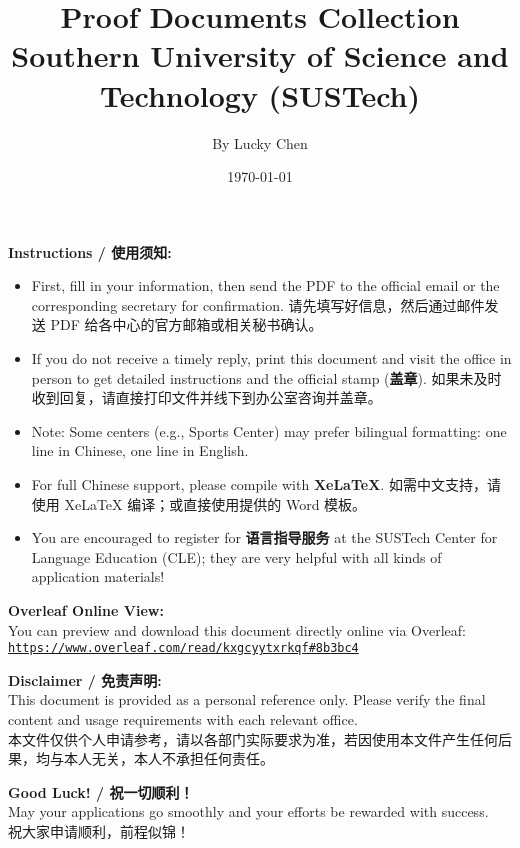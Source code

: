 \documentclass[12pt,a4paper]{article}
\title{
    \vspace{-2cm} %
    {\Huge \textbf{Proof Documents Collection}}\\[0.3cm]
    {\Large Southern University of Science and Technology (SUSTech)}
    \vspace{-0.5cm} %
}
\author{By Lucky Chen}
\date{\today}
\begin{document}
\maketitle
\thispagestyle{empty}

\noindent \textbf{Instructions / 使用须知:}

\begin{itemize}
    \item First, fill in your information, then send the PDF to the official email or the corresponding secretary for confirmation. 请先填写好信息，然后通过邮件发送 PDF 给各中心的官方邮箱或相关秘书确认。
    \item If you do not receive a timely reply, print this document and visit the office in person to get detailed instructions and the official stamp (\textbf{盖章}). 如果未及时收到回复，请直接打印文件并线下到办公室咨询并盖章。
    \item Note: Some centers (e.g., Sports Center) may prefer bilingual formatting: one line in Chinese, one line in English.
    \item For full Chinese support, please compile with \textbf{XeLaTeX}. 如需中文支持，请使用 XeLaTeX 编译；或直接使用提供的 Word 模板。
    \item You are encouraged to register for \textbf{语言指导服务} at the SUSTech Center for Language Education (CLE); they are very helpful with all kinds of application materials!
\end{itemize}

\noindent \textbf{Overleaf Online View:} \\
You can preview and download this document directly online via Overleaf: \\
\href{https://www.overleaf.com/read/kxgcyytxrkqf#8b3bc4}{\texttt{https://www.overleaf.com/read/kxgcyytxrkqf\#8b3bc4}}

\vspace{0.5cm}
\noindent \textbf{Disclaimer / 免责声明:} \\
This document is provided as a personal reference only. Please verify the final content and usage requirements with each relevant office. \\
本文件仅供个人申请参考，请以各部门实际要求为准，若因使用本文件产生任何后果，均与本人无关，本人不承担任何责任。

\vspace{0.5cm}
\noindent \textbf{Good Luck! / 祝一切顺利！} \\
May your applications go smoothly and your efforts be rewarded with success.\\祝大家申请顺利，前程似锦！
\end{document}
